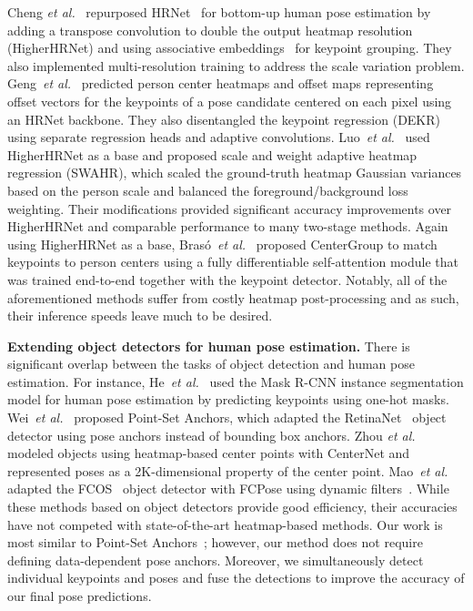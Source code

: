 \documentclass[runningheads]{llncs}
\newcommand{\etal}{\textit{et al.}}
\newcommand\hlll[1]{\bgroup
  \hskip0pt\color{black}#1\egroup
}
\begin{document}
Cheng \etal~\cite{cheng2020higherhrnet} repurposed HRNet~\cite{sun2019deep} for bottom-up human pose estimation by adding a transpose convolution to double the output heatmap resolution (HigherHRNet) and using associative embeddings~\cite{newell2017associative} for keypoint grouping. They also implemented multi-resolution training to address the scale variation problem.
Geng~\etal~\cite{geng2021bottom} predicted person center heatmaps and  offset maps representing offset vectors for the  keypoints of a pose candidate centered on each pixel using an HRNet backbone. They also disentangled the keypoint regression (DEKR) using separate regression heads and adaptive convolutions.
Luo~\etal~\cite{luo2021rethinking} used HigherHRNet as a base and proposed scale and weight adaptive heatmap regression (SWAHR), which scaled the ground-truth heatmap Gaussian \hlll{variances} based on the person scale and balanced the foreground/background loss weighting. Their modifications provided significant accuracy improvements over HigherHRNet and comparable performance to many two-stage methods.
Again using HigherHRNet as a base, Bras\'{o}~\etal~\cite{braso2021center} proposed CenterGroup to match keypoints to person centers using a fully differentiable self-attention module that was trained end-to-end together with the keypoint detector. \hlll{Notably, all of the aforementioned methods} suffer from costly heatmap post-processing and as such, their inference speeds leave much to be desired.

\smallskip\noindent\textbf{Extending object detectors for human pose estimation.} There \hlll{is} significant overlap between the tasks of object detection and human pose estimation. For instance, He~\etal~\cite{he2017mask} used the Mask R-CNN instance segmentation model for human pose estimation by predicting keypoints using one-hot masks. Wei~\etal~\cite{wei2020point} proposed Point-Set Anchors, which adapted the RetinaNet~\cite{lin2017focal} object detector using pose anchors instead of bounding box anchors. Zhou \etal~\cite{zhou2019objects} modeled objects using heatmap-based center points with CenterNet and represented poses as a 2K-dimensional property of the center point. Mao~\etal~\cite{mao2021fcpose} adapted the FCOS~\cite{tian2019fcos} object detector with FCPose using dynamic filters~\cite{jia2016dynamic}. While these methods based on object detectors provide good efficiency, their accuracies have not competed with state-of-the-art heatmap-based methods. Our work is most similar \hlll{to} Point-Set Anchors~\cite{wei2020point}; however, our method does not require defining data-dependent pose anchors. Moreover, we simultaneously detect individual keypoints and poses and fuse the detections to improve the accuracy of our final pose predictions.
\end{document}
